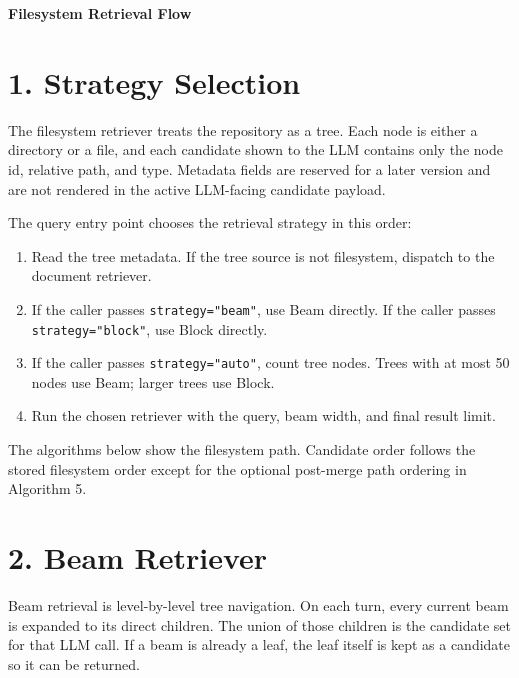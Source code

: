 \documentclass{article}
\begin{document}
\pagestyle{empty}

\begin{center}
{\Large\bfseries Filesystem Retrieval Flow}
\end{center}

\section*{1. Strategy Selection}

The filesystem retriever treats the repository as a tree. Each node is either a
directory or a file, and each candidate shown to the LLM contains only the node
id, relative path, and type. Metadata fields are reserved for a later version
and are not rendered in the active LLM-facing candidate payload.

The query entry point chooses the retrieval strategy in this order:
\begin{enumerate}
  \item Read the tree metadata. If the tree source is not filesystem, dispatch
  to the document retriever.
  \item If the caller passes \texttt{strategy="beam"}, use Beam directly.
  If the caller passes \texttt{strategy="block"}, use Block directly.
  \item If the caller passes \texttt{strategy="auto"}, count tree nodes.
  Trees with at most 50 nodes use Beam; larger trees use Block.
  \item Run the chosen retriever with the query, beam width, and final result
  limit.
\end{enumerate}

The algorithms below show the filesystem path. Candidate order follows the
stored filesystem order except for the optional post-merge path ordering in
Algorithm 5.

\section*{2. Beam Retriever}

Beam retrieval is level-by-level tree navigation. On each turn, every current
beam is expanded to its direct children. The union of those children is the
candidate set for that LLM call. If a beam is already a leaf, the leaf itself is
kept as a candidate so it can be returned.
\end{document}
